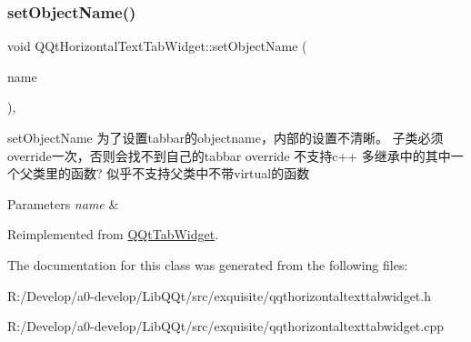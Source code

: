 \subsubsection{\texorpdfstring{set\+Object\+Name()}{setObjectName()}}
{\footnotesize\ttfamily void Q\+Qt\+Horizontal\+Text\+Tab\+Widget\+::set\+Object\+Name (\begin{DoxyParamCaption}\item[{const Q\+String \&}]{name }\end{DoxyParamCaption})\hspace{0.3cm}{\ttfamily [override]}, {\ttfamily [virtual]}}



set\+Object\+Name 为了设置tabbar的objectname，内部的设置不清晰。 子类必须override一次，否则会找不到自己的tabbar override 不支持c++ 多继承中的其中一个父类里的函数? 似乎不支持父类中不带virtual的函数 


\begin{DoxyParams}{Parameters}
{\em name} & \\
\hline
\end{DoxyParams}


Reimplemented from \mbox{\hyperlink{class_q_qt_tab_widget_a45cec441f1ceb658d628a23c110359f3}{Q\+Qt\+Tab\+Widget}}.



The documentation for this class was generated from the following files\+:\begin{DoxyCompactItemize}
\item 
R\+:/\+Develop/a0-\/develop/\+Lib\+Q\+Qt/src/exquisite/qqthorizontaltexttabwidget.\+h\item 
R\+:/\+Develop/a0-\/develop/\+Lib\+Q\+Qt/src/exquisite/qqthorizontaltexttabwidget.\+cpp\end{DoxyCompactItemize}

